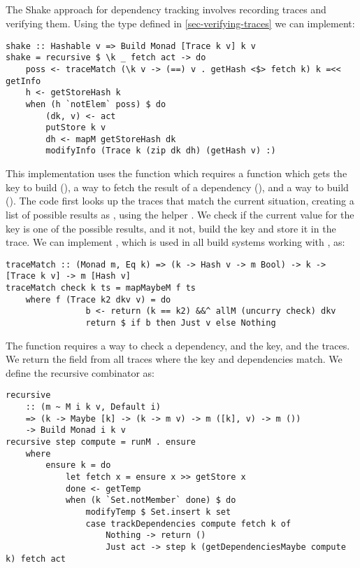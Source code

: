 \subsection{\Shake}\label{sec-implementation-shake}

The Shake approach for dependency tracking involves recording traces and verifying them. Using the  type defined in \ref{sec-verifying-traces} we can implement:

\begin{verbatim}
shake :: Hashable v => Build Monad [Trace k v] k v
shake = recursive $ \k _ fetch act -> do
    poss <- traceMatch (\k v -> (==) v . getHash <$> fetch k) k =<< getInfo
    h <- getStoreHash k
    when (h `notElem` poss) $ do
        (dk, v) <- act
        putStore k v
        dh <- mapM getStoreHash dk
        modifyInfo (Trace k (zip dk dh) (getHash v) :)
\end{verbatim}

This implementation uses the  function which requires a function which gets the key to build (), a way to fetch the result of a dependency (), and a way to build  (). The code first looks up the traces that match the current situation, creating a list of possible results as , using the helper . We check if the current value for the key is one of the possible results, and it not, build the key and store it in the trace. We can implement , which is used in all build systems working with , as:

\begin{verbatim}
traceMatch :: (Monad m, Eq k) => (k -> Hash v -> m Bool) -> k -> [Trace k v] -> m [Hash v]
traceMatch check k ts = mapMaybeM f ts
    where f (Trace k2 dkv v) = do
                b <- return (k == k2) &&^ allM (uncurry check) dkv
                return $ if b then Just v else Nothing
\end{verbatim}

The function  requires a way to check a dependency, and the key, and the traces. We return the  field from all traces where the key and dependencies match. We define the recursive combinator as:

\begin{verbatim}
recursive
    :: (m ~ M i k v, Default i)
    => (k -> Maybe [k] -> (k -> m v) -> m ([k], v) -> m ())
    -> Build Monad i k v
recursive step compute = runM . ensure
    where
        ensure k = do
            let fetch x = ensure x >> getStore x
            done <- getTemp
            when (k `Set.notMember` done) $ do
                modifyTemp $ Set.insert k set
                case trackDependencies compute fetch k of
                    Nothing -> return ()
                    Just act -> step k (getDependenciesMaybe compute k) fetch act
\end{verbatim}

